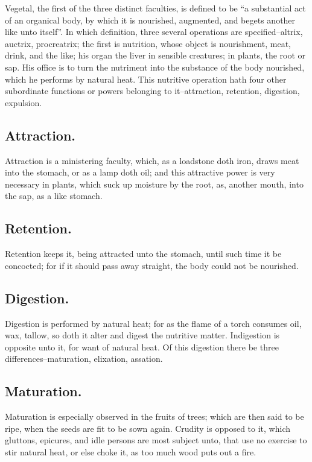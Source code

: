 Vegetal, the first of the three distinct faculties, is defined to be \enquote{a
substantial act of an organical body, by which it is nourished, augmented, and
begets another like unto itself}. In which definition, three several operations
are specified--altrix, auctrix, procreatrix; the first is
nutrition, whose object is nourishment, meat, drink, and
the like; his organ the liver in sensible creatures; in plants, the root or
sap. His office is to turn the nutriment into the substance of the body
nourished, which he performs by natural heat. This nutritive operation hath
four other subordinate functions or powers belonging to it--attraction,
retention, digestion, expulsion.

\subsection{Attraction.}

Attraction is a ministering faculty, which, as a loadstone
doth iron, draws meat into the stomach, or as a lamp doth oil; and this
attractive power is very necessary in plants, which suck up moisture by the
root, as, another mouth, into the sap, as a like stomach.

\subsection{Retention.}

Retention keeps it, being attracted unto the stomach, until such time it be
concocted; for if it should pass away straight, the body could not be
nourished.

\subsection{Digestion.}

Digestion is performed by natural heat; for as the flame of a torch consumes
oil, wax, tallow, so doth it alter and digest the nutritive matter. Indigestion
is opposite unto it, for want of natural heat. Of this digestion there be three
differences--maturation, elixation, assation.

\subsection{Maturation.}

Maturation is especially observed in the fruits of trees; which are then said
to be ripe, when the seeds are fit to be sown again. Crudity is opposed to it,
which gluttons, epicures, and idle persons are most subject unto, that use no
exercise to stir natural heat, or else choke it, as too much wood puts out a
fire.

